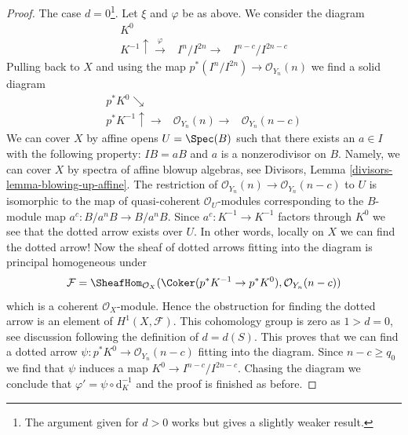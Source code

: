 \begin{proof}
\medskip\noindent
The case $d = 0$\footnote{The argument given for $d > 0$ works but gives
a slightly weaker result.}. Let $\xi$ and $\varphi$ be as above.
We consider the diagram
$$
\begin{array}{ccc}K^0 &  &  \\ K^{-1} \uparrow\overset{\varphi}{\longrightarrow} & I^n/I^{2n} \longrightarrow & I^{n - c}/I^{2n - c}\end{array}
$$
Pulling back to $X$ and using the map
$p^*(I^n/I^{2n}) \to \mathcal{O}_{Y_n}(n)$
we find a solid diagram
$$
\begin{array}{ccc}p^*K^0 \searrow &  &  \\ p^*K^{-1} \uparrow\longrightarrow & \mathcal{O}_{Y_n}(n) \longrightarrow & \mathcal{O}_{Y_n}(n - c)\end{array}
$$
We can cover $X$ by affine opens $U = \Spec(B)$ such that there
exists an $a \in I$ with the following property: $IB = aB$
and $a$ is a nonzerodivisor on $B$. Namely, we can cover
$X$ by spectra of affine blowup algebras, see
Divisors, Lemma \ref{divisors-lemma-blowing-up-affine}.
The restriction of $\mathcal{O}_{Y_n}(n) \to \mathcal{O}_{Y_n}(n - c)$
to $U$ is isomorphic to the map of quasi-coherent $\mathcal{O}_U$-modules
corresponding to the $B$-module map $a^c : B/a^nB \to B/a^nB$.
Since $a^c : K^{-1} \to K^{-1}$ factors through $K^0$ we see that
the dotted arrow exists over $U$. In other words,
locally on $X$ we can find the dotted arrow! Now the sheaf of dotted
arrows fitting into the diagram is principal homogeneous under
$$
\mathcal{F} = \SheafHom_{\mathcal{O}_X}(
\Coker(p^*K^{-1} \to p^*K^0), \mathcal{O}_{Y_n}(n - c))
$$
which is a coherent $\mathcal{O}_X$-module.
Hence the obstruction for finding the dotted arrow is an element
of $H^1(X, \mathcal{F})$. This cohomology group is zero as
$1 > d = 0$, see discussion following the definition of $d = d(S)$.
This proves that we can find a dotted arrow
$\psi : p^*K^0 \to \mathcal{O}_{Y_n}(n - c)$
fitting into the diagram. Since $n - c \geq q_0$
we find that $\psi$ induces a map $K^0 \to I^{n - c}/I^{2n - c}$.
Chasing the diagram we conclude that $\varphi' = \psi \circ \text{d}_K^{-1}$
and the proof is finished as before.
\end{proof}



